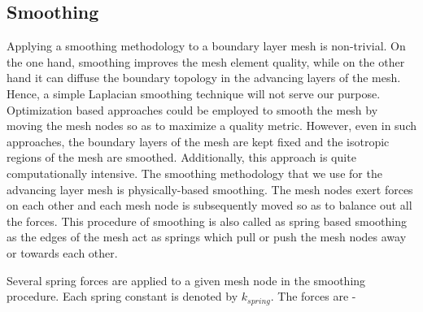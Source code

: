 \documentclass[conf]{new-aiaa}
\begin{document}
\subsection{Smoothing}

Applying a smoothing methodology to a boundary layer mesh is non-trivial. On the one hand, smoothing improves the mesh element quality, while on the other hand it can diffuse the boundary topology in the advancing layers of the mesh. Hence, a simple Laplacian smoothing technique will not serve our purpose. Optimization based approaches could be employed to smooth the mesh by moving the mesh nodes so as to maximize a quality metric\cite{canann1998approach}. However, even in such approaches, the boundary layers of the mesh are kept fixed and the isotropic regions of the mesh are smoothed. Additionally, this approach is quite computationally intensive. The smoothing methodology that we use for the advancing layer mesh is physically-based smoothing. The mesh nodes exert forces on each other and each mesh node is subsequently moved so as to balance out all the forces. This procedure of smoothing is also called as spring based smoothing as the edges of the mesh act as springs which pull or push the mesh nodes away or towards each other.

Several spring forces are applied to a given mesh node in the smoothing procedure. Each spring constant is denoted by $k_{spring}$. The forces are -
\end{document}
